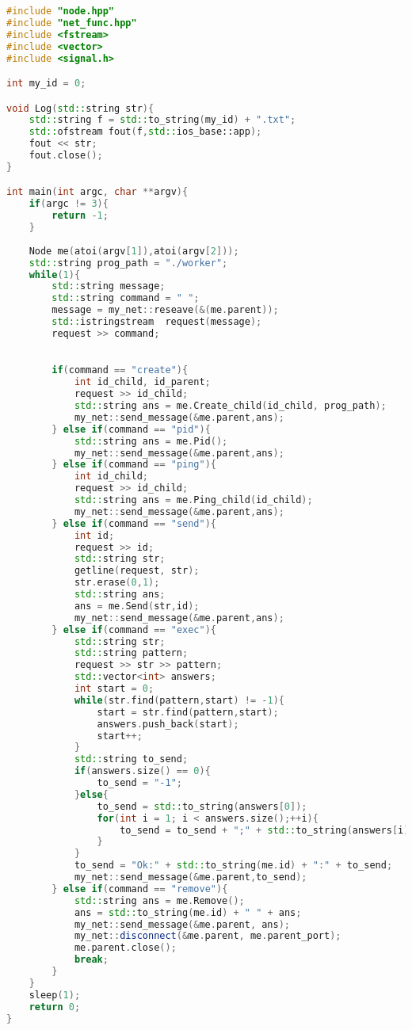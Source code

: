 \documentclass[pdf, unicode, 12pt, a4paper,oneside,fleqn]{article}
\begin{document}
\begin{lstlisting}[language=C++]
#include "node.hpp"
#include "net_func.hpp"
#include <fstream>
#include <vector>
#include <signal.h>

int my_id = 0;

void Log(std::string str){
    std::string f = std::to_string(my_id) + ".txt";
    std::ofstream fout(f,std::ios_base::app);
    fout << str;
    fout.close();
}

int main(int argc, char **argv){
    if(argc != 3){
        return -1;
    }
    
    Node me(atoi(argv[1]),atoi(argv[2]));
    std::string prog_path = "./worker";
    while(1){
        std::string message;
        std::string command = " ";
        message = my_net::reseave(&(me.parent));
        std::istringstream  request(message);
        request >> command;

        
        if(command == "create"){
            int id_child, id_parent;
            request >> id_child;
            std::string ans = me.Create_child(id_child, prog_path);
            my_net::send_message(&me.parent,ans);
        } else if(command == "pid"){
            std::string ans = me.Pid();
            my_net::send_message(&me.parent,ans);
        } else if(command == "ping"){
            int id_child;
            request >> id_child;
            std::string ans = me.Ping_child(id_child);
            my_net::send_message(&me.parent,ans);
        } else if(command == "send"){
            int id;
            request >> id;
            std::string str;
            getline(request, str);
            str.erase(0,1);
            std::string ans;
            ans = me.Send(str,id);
            my_net::send_message(&me.parent,ans);
        } else if(command == "exec"){
            std::string str;
            std::string pattern;
            request >> str >> pattern;
            std::vector<int> answers;
            int start = 0;
            while(str.find(pattern,start) != -1){
                start = str.find(pattern,start);
                answers.push_back(start);
                start++;
            }
            std::string to_send;
            if(answers.size() == 0){
                to_send = "-1";
            }else{
                to_send = std::to_string(answers[0]);
                for(int i = 1; i < answers.size();++i){
                    to_send = to_send + ";" + std::to_string(answers[i]);
                }
            }
            to_send = "Ok:" + std::to_string(me.id) + ":" + to_send;
            my_net::send_message(&me.parent,to_send);
        } else if(command == "remove"){
            std::string ans = me.Remove();
            ans = std::to_string(me.id) + " " + ans;
            my_net::send_message(&me.parent, ans);
            my_net::disconnect(&me.parent, me.parent_port);
            me.parent.close();
            break;
        }
    }
    sleep(1);
    return 0;
}
\end{lstlisting}
\end{document}
